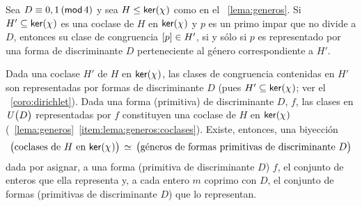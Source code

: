 \begin{teoGenerosB}\label{teo:generos}
	Sea $D\equiv 0,1\tmodulo[4]$ y sea
	$H\subgrpeq\ker(\varkronecker)$ como en el
	\lemaname~\ref{lema:generos}.
	Si $H'\subseteq\ker(\varkronecker)$ es una coclase de
	$H$ en $\ker(\varkronecker)$ y $p$ es un primo impar
	que no divide a $D$, entonces su clase de congruencia
	$\clase p\in H'$, si y s\'olo si $p$ es representado por
	una forma de discriminante $D$ perteneciente al g\'enero
	correspondiente a $H'$.
\end{teoGenerosB}

\begin{obsGenerosB}\label{obs:generos:correspondencia}
	Dada una coclase $H'$ de $H$ en $\ker(\varkronecker)$, las clases de
	congruencia contenidas en $H'$ son representadas por formas
	de discriminante $D$ (pues $H'\subseteq\ker(\varkronecker)$; ver el
	\coroname~\ref{coro:dirichlet}).
	Dada una forma (primitiva) de discriminante $D$, $f$,
	las clases en $\Unidadesmod[D]$ representadas por $f$
	constituyen una coclase de $H$ en $\ker(\varkronecker)$
	(\lemaname~\ref{lema:generos}~\eqref{item:lema:generos:coclases}).
	Existe, entonces, una biyecci\'on
	\begin{displaymath}
		\big(
			\text{coclases de }
			H\text{ en }\ker(\varkronecker)
		\big)\,\simeq\,
		\big(
			\text{g\'eneros de formas primitivas %
				de discriminante } D
		\big)
	\end{displaymath}
	dada por asignar, a una forma (primitiva de discriminante $D$) $f$,
	el conjunto de enteros que ella representa
	y, a cada entero $m$ coprimo con $D$, el conjunto de formas
	(primitivas de discriminante $D$) que lo representan.
\end{obsGenerosB}

